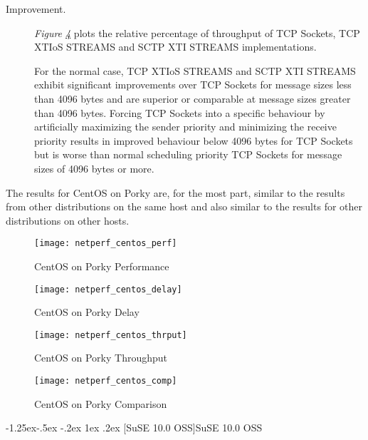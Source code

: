 \documentclass[letterpaper,final,notitlepage,twocolumn,10pt,twoside]{article}
\makeatletter
\renewcommand\subsubsection{\@startsection{subsubsection}{3}{\z@}%
                                     {-1.25ex\@plus -.5ex \@minus -.2ex}%
                                     {1ex \@plus .2ex}%
                                     {\normalfont\normalsize\bfseries}}
\makeatother
\begin{document}
\begin{description}
\item[Improvement.]

\textit{Figure \ref{figure:centoscomp}}
plots the relative percentage of throughput of TCP Sockets, TCP XTIoS STREAMS and SCTP XTI STREAMS
implementations.

For the normal case, TCP XTIoS STREAMS and SCTP XTI STREAMS exhibit significant improvements over
TCP Sockets for message sizes less than 4096 bytes and are superior or comparable  at message sizes
greater than 4096 bytes.  Forcing TCP Sockets into a specific behaviour by artificially maximizing
the sender priority and minimizing the receive priority results in improved behaviour below 4096
bytes for TCP Sockets but is worse than normal scheduling priority TCP Sockets for message sizes of
4096 bytes or more.

\end{description}

The results for CentOS on Porky are, for the most part, similar to the results from other
distributions on the same host and also similar to the results for other distributions on other
hosts.

\begin{figure}[p]
\center\texttt{[image: netperf\_centos\_perf]}
\caption[CentOS on Porky Performance]{CentOS on Porky Performance}
\label{figure:centosperf}
\end{figure}

\begin{figure}[p]
\center\texttt{[image: netperf\_centos\_delay]}
\caption[CentOS on Porky Delay]{CentOS on Porky Delay}
\label{figure:centosdly}
\end{figure}

\begin{figure}[p]
\center\texttt{[image: netperf\_centos\_thrput]}
\caption[CentOS on Porky Throughput]{CentOS on Porky Throughput}
\label{figure:centosthrput}
\end{figure}

\begin{figure}[pt]
\center\texttt{[image: netperf\_centos\_comp]}
\caption[CentOS on Porky Comparison]{CentOS on Porky Comparison}
\label{figure:centoscomp}
\end{figure}

\subsubsection[SuSE 10.0 OSS]{SuSE 10.0 OSS}
\end{document}
